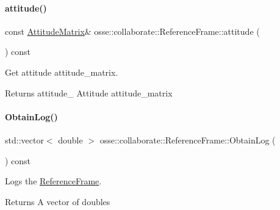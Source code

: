 \paragraph{\texorpdfstring{attitude()}{attitude()}}
{\footnotesize\ttfamily const \hyperlink{classosse_1_1collaborate_1_1_attitude_matrix}{Attitude\+Matrix}\& osse\+::collaborate\+::\+Reference\+Frame\+::attitude (\begin{DoxyParamCaption}{ }\end{DoxyParamCaption}) const\hspace{0.3cm}{\ttfamily [inline]}}



Get attitude attitude\+\_\+matrix. 

\begin{DoxyReturn}{Returns}
attitude\+\_\+ Attitude attitude\+\_\+matrix 
\end{DoxyReturn}
\mbox{\label{classosse_1_1collaborate_1_1_reference_frame_ac448c98f8206e372f7c367b511f008e6}} 
\paragraph{\texorpdfstring{Obtain\+Log()}{ObtainLog()}}
{\footnotesize\ttfamily std\+::vector$<$ double $>$ osse\+::collaborate\+::\+Reference\+Frame\+::\+Obtain\+Log (\begin{DoxyParamCaption}{ }\end{DoxyParamCaption}) const}



Logs the \hyperlink{classosse_1_1collaborate_1_1_reference_frame}{Reference\+Frame}. 

\begin{DoxyReturn}{Returns}
A vector of doubles 
\end{DoxyReturn}
\mbox{\label{classosse_1_1collaborate_1_1_reference_frame_a58806d59231dd107bf2b25a0a7396266}} 
